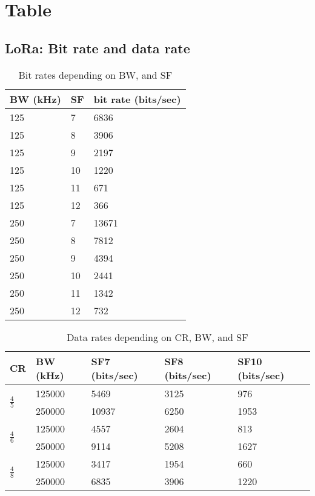 \chapter{Table}

\section{LoRa: Bit rate and data rate}

\begin{table}[h!]
\centering
\begin{tabular}{@{}lll@{}}
\toprule
BW (kHz) & SF & bit rate (bits/sec) \\ \midrule
125     & 7 & 6836 \\
125     & 8 & 3906 \\
125     & 9 & 2197 \\
125     & 10 & 1220 \\
125     & 11 & 671 \\
125     & 12 & 366 \\
250     & 7 & 13671 \\
250     & 8 & 7812 \\
250     & 9 & 4394 \\
250     & 10 & 2441 \\
250     & 11 & 1342 \\
250     & 12 & 732 \\ \bottomrule
\end{tabular}
\caption{Bit rates depending on BW, and SF\label{table:bitrate}}
\end{table}

\begin{table}[h!]
\centering
\begin{tabular}{@{}lllll@{}}
\toprule
CR & BW (kHz) & SF7 (bits/sec) & SF8 (bits/sec) & SF10 (bits/sec) \\ \midrule
\multirow{2}{*}{$\frac{4}{5}$} & 125000   & 5469           & 3125           & 976             \\
  & 250000   & 10937          & 6250           & 1953            \\
\multirow{2}{*}{$\frac{4}{6}$} & 125000   & 4557           & 2604           & 813             \\
  & 250000   & 9114           & 5208           & 1627            \\
\multirow{2}{*}{$\frac{4}{8}$} & 125000   & 3417           & 1954           & 660             \\
  & 250000   & 6835           & 3906           & 1220            \\ \bottomrule
\end{tabular}
\caption{Data rates depending on CR, BW, and SF\label{table:datarate}}
\end{table}

